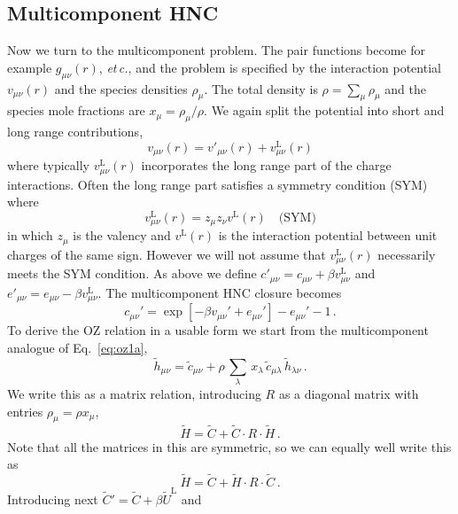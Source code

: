 \documentclass[12pt,a4paper]{article}
\newcommand{\latin}[1]{\emph{#1}}
\newcommand{\etc}{\latin{et\,c.}}
\newcommand{\lr}{^{\mathrm{L}}}
\newcommand{\Eqref}[1]{Eq.~\eqref{#1}}
\begin{document}
\subsection{Multicomponent HNC}
%
Now we turn to the multicomponent problem.  The pair functions
become for example $g_{\mu\nu}(r)$, \etc, and the problem is specified
by the interaction potential $v_{\mu\nu}(r)$ and the species densities
$\rho_\mu$.  The total density is $\rho=\sum_\mu \rho_\mu$ and the
species mole fractions are $x_\mu=\rho_\mu/\rho$.  We again split the
potential into short and long range contributions, 
%
\begin{equation}
v_{\mu\nu}(r)=v'_{\mu\nu}(r)+ v\lr_{\mu\nu}(r)
\end{equation}
%
where typically $v\lr_{\mu\nu}(r)$ incorporates the long range part of
the charge interactions.  Often the long range part satisfies a
symmetry condition (SYM) where
%
\begin{equation}
v\lr_{\mu\nu}(r)=z_\mu z_\nu v\lr(r)\quad\text{(SYM)}
\label{eq:sp}
\end{equation}
in which $z_\mu$ is the valency and $v\lr(r)$ is the interaction
potential between unit charges of the same sign.  However we will not
assume that $v\lr_{\mu\nu}(r)$ necessarily meets the SYM condition.  As
above we define $c'_{\mu\nu} = c_{\mu\nu} + \beta v\lr_{\mu\nu}$ and
$e'_{\mu\nu} = e_{\mu\nu} - \beta v\lr_{\mu\nu}$.  The multicomponent
HNC closure becomes
%
\begin{equation}
c_{\mu\nu}'=\exp[-\beta v_{\mu\nu}'+e_{\mu\nu}']-e_{\mu\nu}'-1\,.
\label{eq:hncnd}
\end{equation}
%
To derive the OZ relation in a usable form we start from 
the multicomponent analogue of \Eqref{eq:oz1a},
%
\begin{equation}
{\tilde h}_{\mu\nu} = {\tilde c}_{\mu\nu}+\rho\,{\textstyle\sum_\lambda}
\,x_\lambda\,{\tilde c}_{\mu\lambda}\,{\tilde h}_{\lambda\nu}\,.
\end{equation}
%
We write this as a matrix relation, introducing $R$ as a diagonal
matrix with entries $\rho_\mu=\rho x_\mu$,
%
\begin{equation}
{\tilde H}={\tilde C}+{\tilde C}\cdot R\cdot{\tilde H}\,.
\label{eq:oz2}
\end{equation}
%
Note that all the matrices in this are symmetric, so we can equally
well write this as
%
\begin{equation}
{\tilde H}={\tilde C}+{\tilde H}\cdot R\cdot{\tilde C}\,.
\label{eq:oz2a}
\end{equation}
%
Introducing next ${\tilde C}' = {\tilde C} + \beta{\tilde U}\lr$ and
\end{document}
